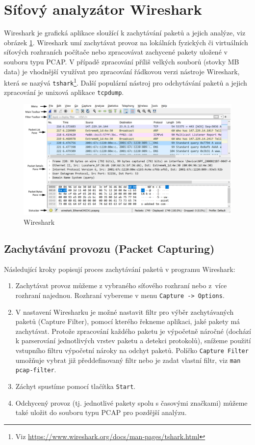 \section{Síťový analyzátor Wireshark}\label{wireshark}
Wireshark je grafická aplikace sloužící k zachytávání paketů a jejich analýze, viz obrázek \ref{fig:wireshark-layout}. Wireshark umí zachytávat provoz na lokálních fyzických či virtuálních síťových rozhraních počítače nebo zpracovávat zachycené pakety uložené v souboru typu PCAP. V případě zpracování příliš velkých souborů (stovky MB data) je vhodnější využívat pro zpracování řádkovou verzi nástroje Wireshark, která se nazývá {\tt tshark}\footnote{Viz \url{https://www.wireshark.org/docs/man-pages/tshark.html}}. Další populární nástroj pro odchytávání paketů a jejich zpracování je unixová aplikace \texttt{tcpdump}. 

\begin{figure}[h]
  \centering
  \includegraphics[width=170mm]{fig/wireshark-layout.pdf}
  \caption{Wireshark}\label{fig:wireshark-layout}
\end{figure}

\subsection{Zachytávání provozu (Packet Capturing)}
Následující kroky popisují proces zachytávání paketů v programu Wireshark:
\begin{enumerate}
  \item Zachytávat provoz můžeme z vybraného síťového rozhraní nebo z~více rozhraní najednou. Rozhraní vybereme v menu \texttt{Capture -> Options}.
  \item V nastavení Wiresharku je možné nastavit filtr pro výběr zachytávaných paketů (Capture Filter), pomocí kterého řekneme aplikaci, jaké pakety má zachytávat. Protože zpracování každého paketu je výpočetně náročné (dochází k parserování jednotlivých vrstev paketu a detekci protokolů), snížeme použití vstupního filtru výpočetní nároky na odchyt paketů. Políčko {\tt Capture Filter} umožňuje vybrat již předdefinovaný filtr nebo je zadat vlastní filtr, viz {\tt man pcap-filter}.
  \item Záchyt spustíme pomocí tlačítka \texttt{Start}.
  \item Odchycený provoz (tj. jednotlivé pakety spolu s časovými značkami) můžeme také uložit do souboru typu PCAP pro pozdější analýzu.
\end{enumerate}

